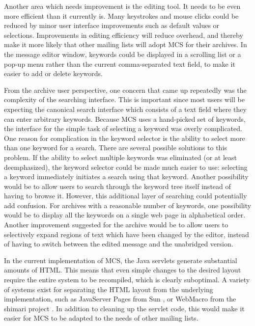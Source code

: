 Another area which needs improvement is the editing tool. It needs to be even
more efficient than it currently is. Many keystrokes and mouse clicks could be
reduced by minor user interface improvements such as default values or
selections. Improvements in editing efficiency will reduce overhead, and
thereby make it more likely that other mailing lists will adopt MCS for their
archives. In the message editor window, keywords could be displayed in a
scrolling list or a pop-up menu rather than the current comma-separated text
field, to make it easier to add or delete keywords.

From the archive user perspective, one concern that came up repeatedly was the
complexity of the searching interface. This is important since most users will
be expecting the canonical search interface which consists of a text field
where they can enter arbitrary keywords. Because MCS uses a hand-picked set of
keywords, the interface for the simple task of selecting a keyword was overly
complicated. One reason for complication in the keyword selector is the ability
to select more than one keyword for a search. There are several possible
solutions to this problem. If the ability to select multiple keywords was
eliminated (or at least deemphasized), the keyword selector could be made much
easier to use: selecting a keyword immediately initiates a search using that
keyword.  Another possibility would be to allow users to search through the
keyword tree itself instead of having to browse it. However, this additional
layer of searching could potentially add confusion. For archives with a
reasonable number of keywords, one possibility would be to display all the
keywords on a single web page in alphabetical order. Another improvement
suggested for the archive would be to allow users to selectively expand regions
of text which have been changed by the editor, instead of having to switch
between the edited message and the unabridged version.

In the current implementation of MCS, the Java servlets generate substantial
amounts of HTML. This means that even simple changes to the desired layout
require the entire system to be recompiled, which is clearly suboptimal. A
variety of systems exist for separating the HTML layout from the underlying
implementation, such as JavaServer Pages from Sun \cite{jsp-website}, or
WebMacro from the shimari project \cite{webmacro-website}. In addition to
cleaning up the servlet code, this would make it easier for MCS to be adapted
to the needs of other mailing lists.

